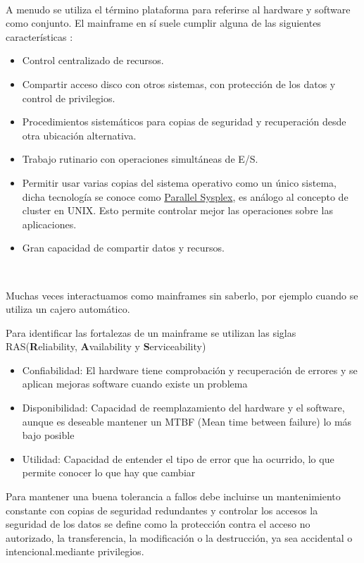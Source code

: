 \documentclass[paper=a4, fontsize=10pt]{scrartcl} %
\numberwithin{equation}{section} %
\numberwithin{figure}{section} %
\numberwithin{table}{section} %
\begin{document}
\

A menudo se utiliza el término plataforma para referirse al hardware y software como conjunto. El mainframe en sí suele cumplir alguna de las siguientes características \cite{ibm-mainframes}:
\begin{itemize}
	\item Control centralizado de recursos.
	\item Compartir acceso disco con otros sistemas, con protección de los datos y control de privilegios.
	\item Procedimientos sistemáticos para copias de seguridad y recuperación desde otra ubicación alternativa.
	\item Trabajo rutinario con operaciones simultáneas de E/S.
	\item Permitir usar varias copias del sistema operativo como un único sistema, dicha tecnología se conoce como \href{https://www-03.ibm.com/systems/z/advantages/pso/}{Parallel Sysplex}, es análogo al concepto de cluster en UNIX.
	Esto permite controlar mejor las operaciones sobre las aplicaciones.
	\item Gran capacidad de compartir datos y recursos.
\end{itemize}


\

Muchas veces interactuamos como mainframes sin saberlo, por ejemplo cuando se utiliza un cajero automático.

Para identificar las fortalezas de un mainframe se utilizan las siglas RAS(\textbf{R}eliability, \textbf{A}vailability y \textbf{S}erviceability)
\begin{itemize}
	\item Confiabilidad: El hardware tiene comprobación y recuperación de errores y se aplican mejoras software cuando existe un problema
	\item Disponibilidad: Capacidad de reemplazamiento del hardware y el software, aunque es deseable mantener un MTBF (Mean time between failure) lo más bajo posible 
	\item Utilidad: Capacidad de entender el tipo de error que ha ocurrido, lo que permite conocer lo que hay que cambiar
\end{itemize}

Para mantener una buena tolerancia a fallos debe incluirse un mantenimiento constante con copias de seguridad redundantes y controlar los accesos la seguridad de los datos se define como la protección contra el acceso no autorizado, la transferencia, la modificación o la destrucción, ya sea accidental o intencional.mediante privilegios.
\end{document}
